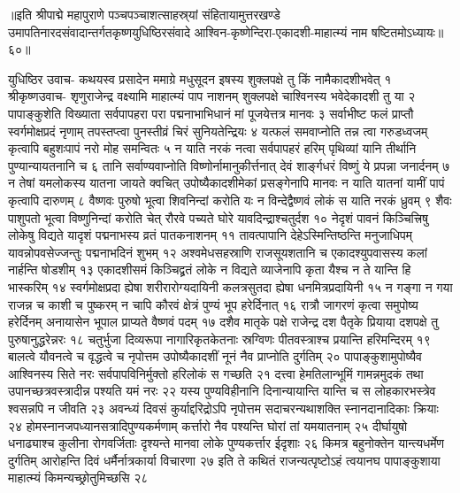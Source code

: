 ॥इति श्रीपाद्मे महापुराणे पञ्चपञ्चाशत्साहस्र्यां संहितायामुत्तरखण्डे उमापतिनारदसंवादान्तर्गतकृष्णयुधिष्ठिरसंवादे आश्विन-कृष्णेन्दिरा-एकादशी-माहात्म्यं नाम षष्टितमोऽध्यायः॥६०॥




युधिष्ठिर उवाच-
कथयस्व प्रसादेन ममाग्रे मधुसूदन 
इषस्य शुक्लपक्षे तु किं नामैकादशीभवेत् १
श्रीकृष्णउवाच-
शृणुराजेन्द्र वक्ष्यामि माहात्म्यं पाप नाशनम् 
शुक्लपक्षे चाश्विनस्य भवेदेकादशी तु या २
पापाङ्कुशेति विख्याता सर्वपापहरा परा 
पद्मनाभाभिधानं मां पूजयेत्तत्र मानवः ३
सर्वाभीष्ट फलं प्राप्तौ स्वर्गमोक्षप्रदं नृणाम् 
तपस्तप्त्वा पुनस्तीव्रं चिरं सुनियतेन्द्रियः ४
यत्फलं समवाप्नोति तन्न त्वा गरुडध्वजम् 
कृत्वापि बहुशःपापं नरो मोह समन्वितः ५
न याति नरकं नत्वा सर्वपापहरं हरिम् 
पृथिव्यां यानि तीर्थानि पुण्यान्यायतनानि च ६
तानि सर्वाण्यवाप्नोति विष्णोर्नामानुकीर्त्तनात् 
देवं शार्ङ्गधरं विष्णुं ये प्रपन्ना जनार्दनम् ७
न तेषां यमलोकस्य यातना जायते क्वचित् 
उपोष्यैकादशीमेकां प्रसङ्गेनापि मानवः 
न याति यातनां यामीं पापं कृत्वापि दारुणम् ८
वैष्णवः पुरुषो भूत्वा शिवनिन्दां करोति यः 
न विन्देद्वैष्णवं लोकं स याति नरकं ध्रुवम् ९
शैवः पाशुपतो भूत्वा विष्णुनिन्दां करोति चेत् 
रौरवे पच्यते घोरे यावदिन्द्राश्चतुर्दश १०
नेदृशं पावनं किञ्चित्त्रिषु लोकेषु विद्यते 
यादृशं पद्मनाभस्य व्रतं पातकनाशनम् ११
तावत्पापानि देहेऽस्मिन्तिष्ठन्ति मनुजाधिपम् 
यावन्नोपवसेज्जन्तुः पद्मनाभदिनं शुभम् १२
अश्वमेधसहस्राणि राजसूयशतानि च 
एकादश्युपवासस्य कलां नार्हन्ति षोडशीम् १३
एकादशीसमं किञ्चिद्व्रतं लोके न विद्यते 
व्याजेनापि कृता यैश्च न ते यान्ति हि भास्करिम् १४
स्वर्गमोक्षप्रदा ह्येषा शरीरारोग्यदायिनी 
कलत्रसुतदा ह्येषा धनमित्रप्रदायिनी १५
न गङ्गा न गया राजन्न च काशी च पुष्करम् 
न चापि कौरवं क्षेत्रं पुण्यं भूप हरेर्दिनात् १६
रात्रौ जागरणं कृत्वा समुपोष्य हरेर्दिनम् 
अनायासेन भूपाल प्राप्यते वैष्णवं पदम् १७
दशैव मातृके पक्षे राजेन्द्र दश पैतृके 
प्रियाया दशपक्षे तु पुरुषानुद्धरेन्नरः १८
चतुर्भुजा दिव्यरूपा नागारिकृतकेतनाः 
स्रग्विणः पीतवस्त्राश्च प्रयान्ति हरिमन्दिरम् १९
बालत्वे यौवनत्वे च वृद्धत्वे च नृपोत्तम 
उपोष्यैकादशीं नूनं नैव प्राप्नोति दुर्गतिम् २०
पापाङ्कुशामुपोष्यैव आश्विनस्य सिते नरः 
सर्वपापविनिर्मुक्तो हरिलोकं स गच्छति २१
दत्त्वा हेमतिलान्भूमिं गामन्नमुदकं तथा 
उपानच्छत्रवस्त्रादीन्न पश्यति यमं नरः २२
यस्य पुण्यविहीनानि दिनान्यायान्ति यान्ति च 
स लोहकारभस्त्रेव श्वसन्नपि न जीवति २३
अवन्ध्यं दिवसं कुर्याद्दरिद्रोऽपि नृपोत्तम 
सदाचरन्यथाशक्ति स्नानदानादिकाः क्रियाः २४
होमस्नानजपध्यानसत्रादिपुण्यकर्मणाम् 
कर्त्तारो नैव पश्यन्ति घोरां तां यमयातनाम् २५
दीर्घायुषो धनाढ्याश्च कुलीना रोगवर्जिताः 
दृश्यन्ते मानवा लोके पुण्यकर्त्तार ईदृशाः २६
किमत्र बहुनोक्तेन यान्त्यधर्मेण दुर्गतिम् 
आरोहन्ति दिवं धर्मैर्नात्रकार्या विचारणा २७
इति ते कथितं राजन्यत्पृष्टोऽहं त्वयानघ 
पापाङ्कुशाया माहात्म्यं किमन्यच्छ्रोतुमिच्छसि २८


